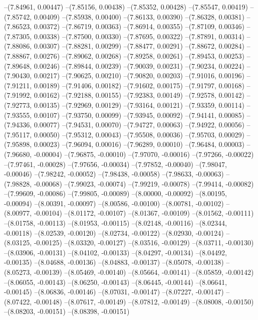 --(7.84961, 0.00447)
--(7.85156, 0.00438)
--(7.85352, 0.00428)
--(7.85547, 0.00419)
--(7.85742, 0.00409)
--(7.85938, 0.00400)
--(7.86133, 0.00390)
--(7.86328, 0.00381)
--(7.86523, 0.00372)
--(7.86719, 0.00363)
--(7.86914, 0.00355)
--(7.87109, 0.00346)
--(7.87305, 0.00338)
--(7.87500, 0.00330)
--(7.87695, 0.00322)
--(7.87891, 0.00314)
--(7.88086, 0.00307)
--(7.88281, 0.00299)
--(7.88477, 0.00291)
--(7.88672, 0.00284)
--(7.88867, 0.00276)
--(7.89062, 0.00268)
--(7.89258, 0.00261)
--(7.89453, 0.00253)
--(7.89648, 0.00246)
--(7.89844, 0.00239)
--(7.90039, 0.00231)
--(7.90234, 0.00224)
--(7.90430, 0.00217)
--(7.90625, 0.00210)
--(7.90820, 0.00203)
--(7.91016, 0.00196)
--(7.91211, 0.00189)
--(7.91406, 0.00182)
--(7.91602, 0.00175)
--(7.91797, 0.00168)
--(7.91992, 0.00162)
--(7.92188, 0.00155)
--(7.92383, 0.00149)
--(7.92578, 0.00142)
--(7.92773, 0.00135)
--(7.92969, 0.00129)
--(7.93164, 0.00121)
--(7.93359, 0.00114)
--(7.93555, 0.00107)
--(7.93750, 0.00099)
--(7.93945, 0.00092)
--(7.94141, 0.00085)
--(7.94336, 0.00077)
--(7.94531, 0.00070)
--(7.94727, 0.00063)
--(7.94922, 0.00056)
--(7.95117, 0.00050)
--(7.95312, 0.00043)
--(7.95508, 0.00036)
--(7.95703, 0.00029)
--(7.95898, 0.00023)
--(7.96094, 0.00016)
--(7.96289, 0.00010)
--(7.96484, 0.00003)
--(7.96680, -0.00004)
--(7.96875, -0.00010)
--(7.97070, -0.00016)
--(7.97266, -0.00022)
--(7.97461, -0.00028)
--(7.97656, -0.00034)
--(7.97852, -0.00040)
--(7.98047, -0.00046)
--(7.98242, -0.00052)
--(7.98438, -0.00058)
--(7.98633, -0.00063)
--(7.98828, -0.00068)
--(7.99023, -0.00074)
--(7.99219, -0.00078)
--(7.99414, -0.00082)
--(7.99609, -0.00086)
--(7.99805, -0.00089)
--(8.00000, -0.00092)
--(8.00195, -0.00094)
--(8.00391, -0.00097)
--(8.00586, -0.00100)
--(8.00781, -0.00102)
--(8.00977, -0.00104)
--(8.01172, -0.00107)
--(8.01367, -0.00109)
--(8.01562, -0.00111)
--(8.01758, -0.00113)
--(8.01953, -0.00115)
--(8.02148, -0.00116)
--(8.02344, -0.00118)
--(8.02539, -0.00120)
--(8.02734, -0.00122)
--(8.02930, -0.00124)
--(8.03125, -0.00125)
--(8.03320, -0.00127)
--(8.03516, -0.00129)
--(8.03711, -0.00130)
--(8.03906, -0.00131)
--(8.04102, -0.00133)
--(8.04297, -0.00134)
--(8.04492, -0.00135)
--(8.04688, -0.00136)
--(8.04883, -0.00137)
--(8.05078, -0.00138)
--(8.05273, -0.00139)
--(8.05469, -0.00140)
--(8.05664, -0.00141)
--(8.05859, -0.00142)
--(8.06055, -0.00143)
--(8.06250, -0.00143)
--(8.06445, -0.00144)
--(8.06641, -0.00145)
--(8.06836, -0.00146)
--(8.07031, -0.00147)
--(8.07227, -0.00147)
--(8.07422, -0.00148)
--(8.07617, -0.00149)
--(8.07812, -0.00149)
--(8.08008, -0.00150)
--(8.08203, -0.00151)
--(8.08398, -0.00151)
